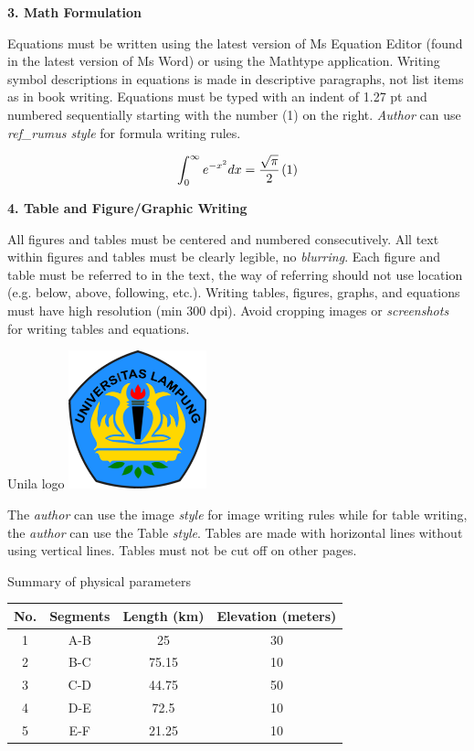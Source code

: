 \documentclass[11pt]{article}
\begin{document}
\noindent\textbf{3. Math Formulation}

Equations must be written using the latest version of Ms Equation Editor (found in the latest version of Ms Word) or using the Mathtype application. Writing symbol descriptions in equations is made in descriptive paragraphs, not list items as in book writing. Equations must be typed with an indent of 1.27 pt and numbered sequentially starting with the number (1) on the right. \textit{Author} can use \textit{ref\_rumus style} for formula writing rules.

\begin{equation}
    \label{eq:formula}
    \int_{0}^{\infty} e^{-x^2} dx = \frac{\sqrt{\pi}}{2} \hspace{1.27pt} (1)
\end{equation}

\noindent\textbf{4. Table and Figure/Graphic Writing}

All figures and tables must be centered and numbered consecutively. All text within figures and tables must be clearly legible, no \textit{blurring}. Each figure and table must be referred to in the text, the way of referring should not use location (e.g. below, above, following, etc.). Writing tables, figures, graphs, and equations must have high resolution (min 300 dpi). Avoid cropping images or \textit{screenshots} for writing tables and equations.

\begin{pepadunfigure}{Unila logo}
    \includegraphics[width=0.3\textwidth]{unila-logo.png} %
\end{pepadunfigure}

The \textit{author} can use the image \textit{style} for image writing rules while for table writing, the \textit{author} can use the Table \textit{style}. Tables are made with horizontal lines without using vertical lines. Tables must not be cut off on other pages.

\begin{pepaduntable}{Summary of physical parameters}
    \begin{tabular}{@{}c c c c@{}}
        \toprule
        \textbf{No.} & \textbf{Segments} & \textbf{Length (km)} & \textbf{Elevation (meters)} \\
        \midrule
        1 & A-B & 25 & 30 \\
        2 & B-C & 75.15 & 10 \\
        3 & C-D & 44.75 & 50 \\
        4 & D-E & 72.5 & 10 \\
        5 & E-F & 21.25 & 10 \\
        \bottomrule
    \end{tabular}
\end{pepaduntable}
\end{document}

